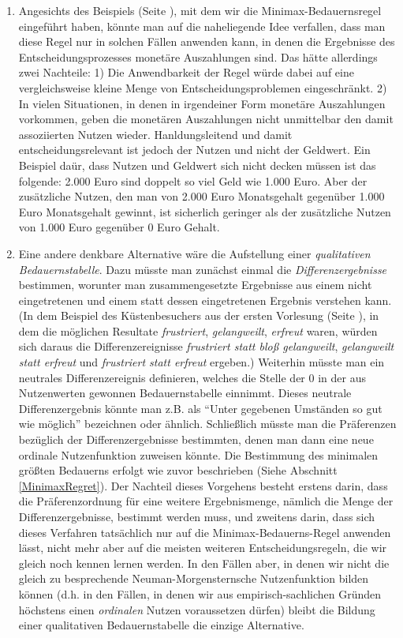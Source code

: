 \begin{enumerate}
  \item Angesichts des Beispiels (Seite \pageref{MinimaxBedauernsRegel}), mit
  dem wir die Mini\-max-\-Bedauernsregel eingeführt haben, könnte man auf die
  naheliegende Idee verfallen, dass man diese Regel nur in solchen Fällen
  anwenden kann, in denen die Ergebnisse des Entscheidungsprozesses monetäre
  Auszahlungen sind. Das hätte allerdings zwei Nachteile: 1) Die Anwendbarkeit
  der Regel würde dabei auf eine vergleichsweise kleine Menge von
  Entscheidungsproblemen eingeschränkt. 2) In vielen Situationen, in denen in
  irgendeiner Form monetäre Auszahlungen vorkommen, geben die monetären
  Auszahlungen nicht unmittelbar den damit assoziierten Nutzen wieder.
  Hanldungsleitend und damit entscheidungsrelevant ist jedoch
  der Nutzen und nicht der Geldwert. Ein Beispiel daür, dass Nutzen und Geldwert sich nicht decken müssen
  ist das folgende: 2.000 Euro sind doppelt so viel Geld wie 1.000 Euro. Aber der
  zusätzliche Nutzen, den man von  2.000 Euro Monatsgehalt 
  gegenüber 1.000 Euro Monatsgehalt gewinnt, ist sicherlich geringer 
  als der zusätzliche Nutzen 
  von 1.000 Euro gegenüber 0 Euro Gehalt.
  
  \item Eine andere denkbare Alternative wäre die Aufstellung einer {\em
  qualitativen Bedauernstabelle}. Dazu müsste man zunächst einmal die
  {\em Differenzergebnisse} bestimmen, worunter man zusammengesetzte Ergebnisse
  aus einem nicht eingetretenen und einem statt dessen eingetretenen
  Ergebnis verstehen kann. (In dem Beispiel des Küstenbesuchers aus der ersten
  Vorlesung (Seite \pageref{AngelnBeispiel}), in dem die möglichen Resultate 
  {\em frustriert}, {\em gelangweilt}, {\em erfreut}
  waren, würden sich daraus die Differenzereignisse {\em frustriert statt
  bloß gelangweilt}, {\em gelangweilt statt erfreut} und {\em frustriert statt
  erfreut} ergeben.) Weiterhin müsste man ein neutrales Differenzereignis
  definieren, welches die Stelle der 0 in der aus Nutzenwerten gewonnen
  Bedauernstabelle einnimmt. Dieses neutrale Differenzergebnis könnte man z.B.
  als "`Unter gegebenen Umständen so gut wie möglich"' bezeichnen oder ähnlich.
  Schließlich müsste man die Präferenzen bezüglich der Differenzergebnisse
  bestimmten, denen man dann eine neue ordinale Nutzenfunktion zuweisen könnte.
  Die Bestimmung des minimalen größten Bedauerns erfolgt wie zuvor beschrieben
  (Siehe Abschnitt \ref{MinimaxRegret}). Der Nachteil dieses Vorgehens besteht
  erstens darin, dass die Präferenzordnung für eine weitere Ergebnismenge,
  nämlich die Menge der Differenzergebnisse, bestimmt werden muss, und zweitens
  darin, dass sich dieses Verfahren tatsächlich nur auf die
  Minimax-Bedauerns-Regel anwenden lässt, nicht mehr aber auf
  die meisten weiteren Entscheidungsregeln,
  die wir gleich noch kennen lernen werden. In den Fällen aber, in denen wir
  nicht die gleich zu besprechende Neuman-Morgensternsche Nutzenfunktion bilden
  können (d.h. in den Fällen, in denen wir aus empirisch-sachlichen
  Gründen höchstens einen {\em ordinalen} Nutzen voraussetzen dürfen) bleibt die
  Bildung einer qualitativen Bedauernstabelle die einzige Alternative.
    

\end{enumerate}
